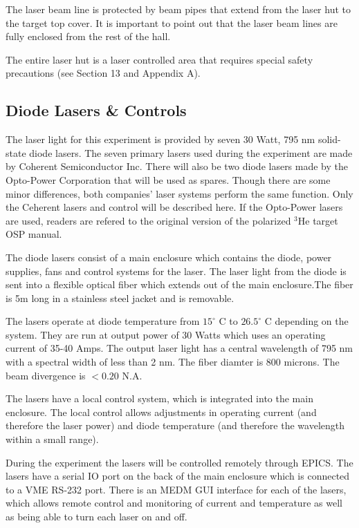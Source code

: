 The laser beam line is
protected by beam pipes that extend from the laser hut to the target
top cover. It is important to point out that the laser beam lines are
fully enclosed from the rest of the hall.

\begin{safetyen}{10}{5}
The entire laser hut is a laser controlled area that requires special
safety precautions (see Section 13 and Appendix A).
\end{safetyen}

\subsection{Diode Lasers \& Controls}

The laser light for this experiment is provided by seven 30 Watt, 795 nm solid-state diode lasers.   The seven primary lasers used during the experiment are made by Coherent Semiconductor Inc.  There will also be two diode lasers made by the Opto-Power Corporation that will be used as spares.  Though there are some minor differences,
both companies' laser systems perform the same function. Only the Ceherent 
lasers and control will be described here. If the Opto-Power lasers are used,
readers are refered to the original version of the polarized $^3$He target
OSP manual.

The diode lasers consist of a main enclosure which contains the diode, power supplies, fans and control systems for the laser.  The laser light from the diode is sent into a flexible optical fiber which extends out of the main enclosure.The fiber is 5m long in a stainless steel jacket and is removable.    

The lasers operate at diode temperature from $15^{\circ}$ C to $26.5^{\circ}$ C depending on the system.  They are run at output power of 30 Watts which uses an operating current of 35-40 Amps.  The output laser light has a central wavelength of 795 nm with a spectral width of less than 2 nm. The fiber diamter is 800 microns.  The beam divergence is $< 0.20$ N.A.

The lasers have a local control system, which is integrated into the main enclosure.  The local control allows adjustments in operating current (and therefore the laser power) and diode temperature (and therefore the wavelength within a
small range).

During the experiment the lasers will be controlled remotely through EPICS.  The lasers have a serial IO port on the back of the main enclosure which is connected to a VME RS-232 port.  There is an MEDM GUI interface for each of the lasers, which
 allows remote control and monitoring of current and temperature as well as being able to turn each laser on and off. 


